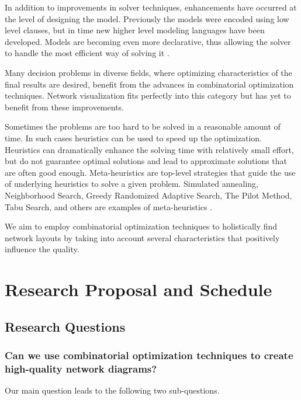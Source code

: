 \documentclass[a4paper,11pt,phdthesis,singlespace,twoside]{cssethesis}
\begin{document}
In addition to improvements in solver techniques, enhancements have occurred at the level of designing the model. Previously the models were encoded using low level clauses, but in time new higher level \cite{minizinc} modeling languages have been developed. Models are becoming even more declarative, thus allowing the solver to handle the most efficient way of solving it \cite{beldiceanu2007global}. 

Many decision problems in diverse fields, where optimizing characteristics of the final results are desired, benefit from the advances in combinatorial optimization techniques. Network visualization fits perfectly into this category but has yet to benefit from these improvements.

Sometimes the problems are too hard to be solved in a reasonable amount of time. In such cases heuristics can be used to speed up the optimization. Heuristics can dramatically enhance the solving time with relatively small effort, but do not guarantee optimal solutions and lead to approximate solutions that are often good enough. 
Meta-heuristics are top-level strategies that guide the use of underlying heuristics to solve a given problem. Simulated annealing, Neighborhood Search, Greedy Randomized Adaptive Search, The Pilot Method, Tabu Search, and others are examples of meta-heuristics \cite{voss2001meta}.

We aim to employ combinatorial optimization techniques to holistically find network layouts by taking into account several characteristics that positively influence the quality.

\chapter{Research Proposal and Schedule} \label{proposal}
\section{Research Questions}
\subsection{Can we use combinatorial optimization techniques to create high-quality network diagrams?}

Our main question leads to the following two sub-questions.
\end{document}
